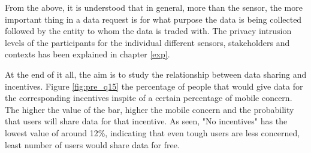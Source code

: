 From the above, it is understood that in general, more than the sensor, the more important thing in a data request is for what purpose the data is being collected followed by the entity to whom the data is traded with. The privacy intrusion levels of the participants for the individual different sensors, stakeholders and contexts has been explained in chapter \ref{exp}.

At the end of it all, the aim is to study the relationship between data sharing and incentives. Figure \ref{fig:pre_q15} the percentage of people that would give data for the corresponding incentives inspite of a certain percentage of mobile concern. The higher the value of the bar, higher the mobile concern and the probability that users will share data for that incentive. As seen, "No incentives" has the lowest value of around 12\%, indicating that even tough users are less concerned, least number of users would share data for free.

%

%

